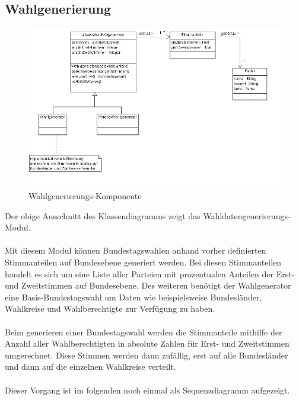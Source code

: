 \documentclass[12pt,a4paper,titlepage]{article}
\begin{document}
\subsection{Wahlgenerierung}
\begin{figure}[!ht]
\includegraphics[scale=0.4]{Wahlgenerator_Klassendiagramm} \caption{Wahlgenerierungs-Komponente} 
\end{figure}

Der obige Ausschnitt des Klassendiagramms zeigt das Wahldatengenerierungs-Modul.\\\\
Mit diesem Modul können Bundestagswahlen anhand vorher definierten Stimmanteilen auf Bundesebene generiert werden. Bei diesen Stimmanteilen handelt es sich um eine Liste aller Parteien mit prozentualen Anteilen der Erst- und Zweitstimmen auf Bundesebene. Des weiteren benötigt der Wahlgenerator eine Basis-Bundestagswahl um Daten wie beispielsweise Bundesländer, Wahlkreise und Wahlberechtigte zur Verfügung zu haben.\\\\
Beim generieren einer Bundestagswahl werden die Stimmanteile mithilfe der Anzahl aller Wahlberechtigten in absolute Zahlen für Erst- und Zweitstimmen umgerechnet. Diese Stimmen werden dann zufällig, erst auf alle Bundesländer und dann auf die einzelnen Wahlkreise verteilt.\\\\
Dieser Vorgang ist im folgenden noch einmal als Sequenzdiagramm aufgezeigt.\\\\

\newpage
\end{document}
